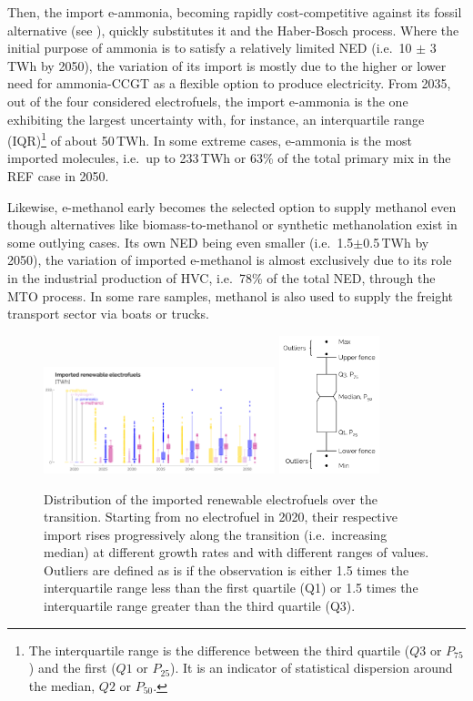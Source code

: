 \documentclass[11pt,twoside,a4paper,english]{article}
\def\ie{i.e.\ }
\begin{document}
Then, the import e-ammonia, becoming rapidly cost-competitive against its fossil alternative (see ), quickly substitutes it and the Haber-Bosch process. Where the initial purpose of ammonia is to satisfy a relatively limited \acrfull{NED} (\ie 10 $\pm$ 3\,TWh by 2050), the variation of its import is mostly due to the higher or lower need for ammonia-\gls{CCGT} as a flexible option to produce electricity. From 2035, out of the four considered electrofuels, the import e-ammonia is the one exhibiting the largest uncertainty with, for instance, an interquartile range (IQR)\footnote{The interquartile range is the difference between the third quartile ($Q3$ or $P_{75}$) and the first ($Q1$ or $P_{25}$). It is an indicator of statistical dispersion around the median, $Q2$ or $P_{50}$.} of about 50\,TWh. In some extreme cases, e-ammonia is the most imported molecules, \ie up to 233\,TWh or 63\% of the total primary mix in the REF case in 2050. 

Likewise, e-methanol early becomes the selected option to supply methanol even though alternatives like biomass-to-methanol or synthetic methanolation exist in some outlying cases. Its own \gls{NED} being even smaller (\ie 1.5$\pm$0.5\,TWh by 2050), the variation of imported e-methanol is almost exclusively due to its role in the industrial production of \gls{HVC}, \ie 78\% of the total \gls{NED}, through the \acrfull{MTO} process. In some rare samples, methanol is also used to supply the freight transport sector via boats or trucks.

\begin{figure}[!htbp]
\centering
\includegraphics[width=0.6\textwidth]{figures/UQ_Electrofuels.pdf}
\includegraphics[height=4cm]{figures/Schematic_boxplot.pdf}
\caption{Distribution of the imported renewable electrofuels over the transition. Starting from no electrofuel in 2020, their respective import rises progressively along the transition (\ie increasing median) at different growth rates and with different ranges of values. Outliers are defined as is if the observation is either 1.5 times the interquartile range less than the first quartile (Q1) or 1.5 times the interquartile range greater than the third quartile (Q3).}
\label{fig:results_uq_electrofuels}
\end{figure}
\end{document}
